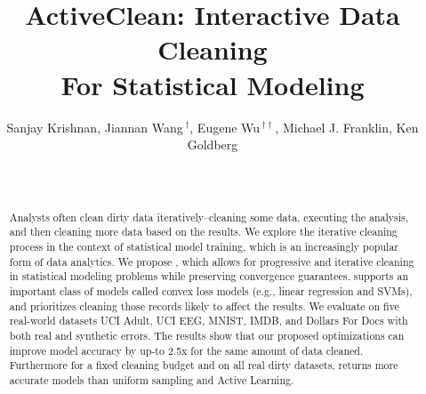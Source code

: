 \documentclass{vldb}
\begin{document}
\newcommand{\reminder}[1]{{{\textcolor{magenta}{\{\{\bf #1\}\}}}\xspace}}
\newcommand{\specialcell}[2][c]{%
  \begin{tabular}[#1]{@{}c@{}}#2\end{tabular}}

\def\ojoin{\setbox0=\hbox{$\bowtie$}%
  \rule[-.02ex]{.25em}{.4pt}\llap{\rule[\ht0]{.25em}{.4pt}}}
\def\leftouterjoin{\mathbin{\ojoin\mkern-5.8mu\bowtie}}
\def\rightouterjoin{\mathbin{\bowtie\mkern-5.8mu\ojoin}}
\def\fullouterjoin{\mathbin{\ojoin\mkern-5.8mu\bowtie\mkern-5.8mu\ojoin}}


\pagestyle{plain}

%

\title{ActiveClean: Interactive Data Cleaning \\ For Statistical Modeling}

\author{ Sanjay Krishnan, Jiannan Wang{$\,^{\dag}$}, Eugene Wu{$\,^{\dag\dag}$}, Michael J. Franklin, Ken Goldberg \\
 \\
\\
}



\maketitle

\begin{abstract}
Analysts often clean dirty data iteratively--cleaning some data, executing the analysis, and then cleaning more data based on the results.
We explore the iterative cleaning process in the context of statistical model training, which is an increasingly popular form of data analytics.  
We propose \sys, which allows for progressive and iterative cleaning in statistical modeling problems while preserving convergence guarantees.
\sys supports an important class of models called convex loss models (e.g., linear regression and SVMs), and prioritizes cleaning those records likely to affect the results.
We evaluate \sys on five real-world datasets UCI Adult, UCI EEG, MNIST, IMDB, and Dollars For Docs with both real and synthetic errors.
The results show that our proposed optimizations can improve model accuracy by up-to 2.5x for the same amount of data cleaned.
Furthermore for a fixed cleaning budget and on all real dirty datasets, \sys returns more accurate models than uniform sampling and Active Learning. 
\end{abstract}
\end{document}
